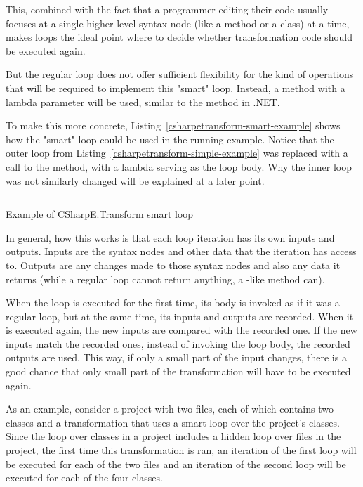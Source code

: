 This, combined with the fact that a programmer editing their code usually focuses at a single higher-level syntax node (like a method or a class) at a time, makes  loops the ideal point where to decide whether transformation code should be executed again.

But the regular  loop does not offer sufficient flexibility for the kind of operations that will be required to implement this "smart"  loop. Instead, a method with a lambda parameter will be used, similar to the  method in .NET. \cite{parallel-foreach}

\medskip

To make this more concrete, Listing~\ref{csharpetransform-smart-example} shows how the "smart"  loop could be used in the running example. Notice that the outer  loop from Listing~\ref{csharpetransform-simple-example} was replaced with a call to the  method, with a lambda serving as the loop body. Why the inner loop was not similarly changed will be explained at a later point.

\begin{listing}
\inputminted[firstline=9,lastline=27]{csharp}{samples/CSharpETransform.Smart/EntityTransformation.cs}
\caption{Example of CSharpE.Transform smart  loop}
\label{csharpetransform-smart-example}
\end{listing}

\medskip

In general, how this works is that each loop iteration has its own inputs and outputs. Inputs are the syntax nodes and other data that the iteration has access to. Outputs are any changes made to those syntax nodes and also any data it returns (while a regular  loop cannot return anything, a -like method can).

When the loop is executed for the first time, its body is invoked as if it was a regular  loop, but at the same time, its inputs and outputs are recorded. When it is executed again, the new inputs are compared with the recorded one. If the new inputs match the recorded ones, instead of invoking the loop body, the recorded outputs are used. This way, if only a small part of the input changes, there is a good chance that only small part of the transformation will have to be executed again.

\medskip

As an example, consider a project with two files, each of which contains two classes and a transformation that uses a smart  loop over the project's classes. Since the loop over classes in a project includes a hidden loop over files in the project, the first time this transformation is ran, an iteration of the first loop will be executed for each of the two files and an iteration of the second loop will be executed for each of the four classes.


